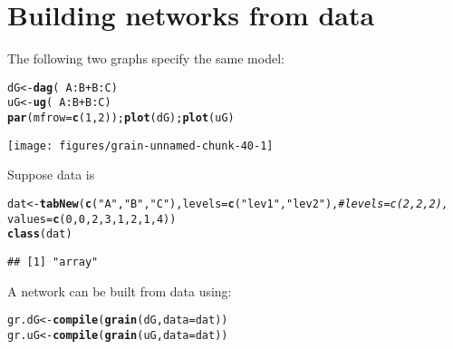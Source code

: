 \documentclass[10pt]{article}\usepackage[]{graphicx}\usepackage[]{xcolor}
\makeatletter
\def\maxwidth{ %
  \ifdim\Gin@nat@width>\linewidth
    \linewidth
  \else
    \Gin@nat@width
  \fi
}
\newcommand{\hlnum}[1]{\textcolor[rgb]{0.686,0.059,0.569}{#1}}%
\newcommand{\hlstr}[1]{\textcolor[rgb]{0.192,0.494,0.8}{#1}}%
\newcommand{\hlcom}[1]{\textcolor[rgb]{0.678,0.584,0.686}{\textit{#1}}}%
\newcommand{\hlopt}[1]{\textcolor[rgb]{0,0,0}{#1}}%
\newcommand{\hlstd}[1]{\textcolor[rgb]{0.345,0.345,0.345}{#1}}%
\newcommand{\hlkwb}[1]{\textcolor[rgb]{0.69,0.353,0.396}{#1}}%
\newcommand{\hlkwc}[1]{\textcolor[rgb]{0.333,0.667,0.333}{#1}}%
\newcommand{\hlkwd}[1]{\textcolor[rgb]{0.737,0.353,0.396}{\textbf{#1}}}%
\newenvironment{kframe}{%
 \def\at@end@of@kframe{}%
 \ifinner\ifhmode%
  \def\at@end@of@kframe{\end{minipage}}%
  \begin{minipage}{\columnwidth}%
 \fi\fi%
 \def\FrameCommand##1{\hskip\@totalleftmargin \hskip-\fboxsep
 \colorbox{shadecolor}{##1}\hskip-\fboxsep
     \hskip-\linewidth \hskip-\@totalleftmargin \hskip\columnwidth}%
 \MakeFramed {\advance\hsize-\width
   \@totalleftmargin\z@ \linewidth\hsize
   \@setminipage}}%
 {\par\unskip\endMakeFramed%
 \at@end@of@kframe}
\newenvironment{knitrout}{}{} %
\makeatother
\begin{document}
\section{Building networks from data}
\label{sec:using-textttsm-argum}

The following two graphs specify the same model:
\begin{knitrout}
\color{fgcolor}\begin{kframe}
\begin{alltt}
\hlstd{dG}  \hlkwb{<-} \hlkwd{dag}\hlstd{(}\hlopt{~}\hlstd{A}\hlopt{:}\hlstd{B} \hlopt{+} \hlstd{B}\hlopt{:}\hlstd{C)}
\hlstd{uG}  \hlkwb{<-} \hlkwd{ug}\hlstd{(}\hlopt{~}\hlstd{A}\hlopt{:}\hlstd{B} \hlopt{+} \hlstd{B}\hlopt{:}\hlstd{C)}
\hlkwd{par}\hlstd{(}\hlkwc{mfrow}\hlstd{=}\hlkwd{c}\hlstd{(}\hlnum{1}\hlstd{,}\hlnum{2}\hlstd{));} \hlkwd{plot}\hlstd{( dG );} \hlkwd{plot}\hlstd{( uG )}
\end{alltt}
\end{kframe}
\texttt{[image: figures/grain-unnamed-chunk-40-1]} 
\end{knitrout}

Suppose data is
\begin{knitrout}
\color{fgcolor}\begin{kframe}
\begin{alltt}
\hlstd{dat} \hlkwb{<-} \hlkwd{tabNew}\hlstd{(}\hlkwd{c}\hlstd{(}\hlstr{"A"}\hlstd{,} \hlstr{"B"}\hlstd{,} \hlstr{"C"}\hlstd{),} \hlkwc{levels}\hlstd{=}\hlkwd{c}\hlstd{(}\hlstr{"lev1"}\hlstd{,} \hlstr{"lev2"}\hlstd{),} \hlcom{#levels=c(2,2,2),}
              \hlkwc{values}\hlstd{=}\hlkwd{c}\hlstd{(}\hlnum{0}\hlstd{,} \hlnum{0}\hlstd{,} \hlnum{2}\hlstd{,} \hlnum{3}\hlstd{,} \hlnum{1}\hlstd{,} \hlnum{2}\hlstd{,} \hlnum{1}\hlstd{,} \hlnum{4}\hlstd{))}
\hlkwd{class}\hlstd{(dat)}
\end{alltt}
\begin{verbatim}
## [1] "array"
\end{verbatim}
\end{kframe}
\end{knitrout}

A network can be built from data using:

\begin{knitrout}
\color{fgcolor}\begin{kframe}
\begin{alltt}
\hlstd{gr.dG} \hlkwb{<-} \hlkwd{compile}\hlstd{(}\hlkwd{grain}\hlstd{( dG,} \hlkwc{data}\hlstd{=dat ))}
\hlstd{gr.uG} \hlkwb{<-} \hlkwd{compile}\hlstd{(}\hlkwd{grain}\hlstd{( uG,} \hlkwc{data}\hlstd{=dat ))}
\end{alltt}
\end{kframe}
\end{knitrout}
\end{document}
